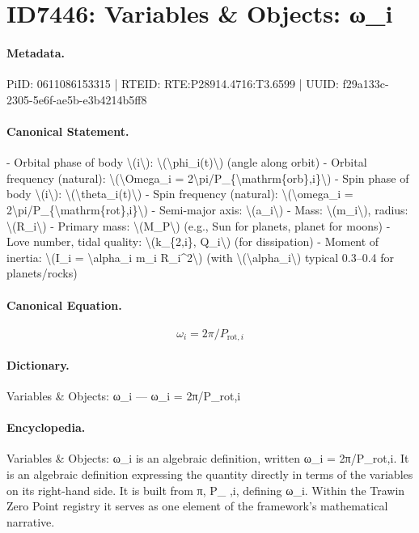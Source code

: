 \section*{ID7446: Variables \& Objects: ω\_i}
\paragraph{Metadata.}
PiID: 0611086153315 | RTEID: RTE:P28914.4716:T3.6599 | UUID: f29a133c-2305-5e6f-ae5b-e3b4214b5ff8

\paragraph{Canonical Statement.}
- Orbital phase of body \textbackslash{}(i\textbackslash{}): \textbackslash{}(\textbackslash{}phi\_i(t)\textbackslash{}) (angle along orbit) - Orbital frequency (natural): \textbackslash{}(\textbackslash{}Omega\_i = 2\textbackslash{}pi/P\_\{\textbackslash{}mathrm\{orb\},i\}\textbackslash{}) - Spin phase of body \textbackslash{}(i\textbackslash{}): \textbackslash{}(\textbackslash{}theta\_i(t)\textbackslash{}) - Spin frequency (natural): \textbackslash{}(\textbackslash{}omega\_i = 2\textbackslash{}pi/P\_\{\textbackslash{}mathrm\{rot\},i\}\textbackslash{}) - Semi-major axis: \textbackslash{}(a\_i\textbackslash{}) - Mass: \textbackslash{}(m\_i\textbackslash{}), radius: \textbackslash{}(R\_i\textbackslash{}) - Primary mass: \textbackslash{}(M\_P\textbackslash{}) (e.g., Sun for planets, planet for moons) - Love number, tidal quality: \textbackslash{}(k\_\{2,i\}, Q\_i\textbackslash{}) (for dissipation) - Moment of inertia: \textbackslash{}(I\_i = \textbackslash{}alpha\_i m\_i R\_i\textasciicircum{}2\textbackslash{}) (with \textbackslash{}(\textbackslash{}alpha\_i\textbackslash{}) typical 0.3–0.4 for planets/rocks)

\paragraph{Canonical Equation.}
\[
\omega_i = 2\pi/P_{\mathrm{rot},i}
\]

\paragraph{Dictionary.}
Variables \& Objects: ω\_i — ω\_i = 2π/P\_rot,i

\paragraph{Encyclopedia.}
Variables \& Objects: ω\_i is an algebraic definition, written ω\_i = 2π/P\_rot,i. It is an algebraic definition expressing the quantity directly in terms of the variables on its right-hand side. It is built from π, P\_ ,i, defining ω\_i. Within the Trawin Zero Point registry it serves as one element of the framework's mathematical narrative.
